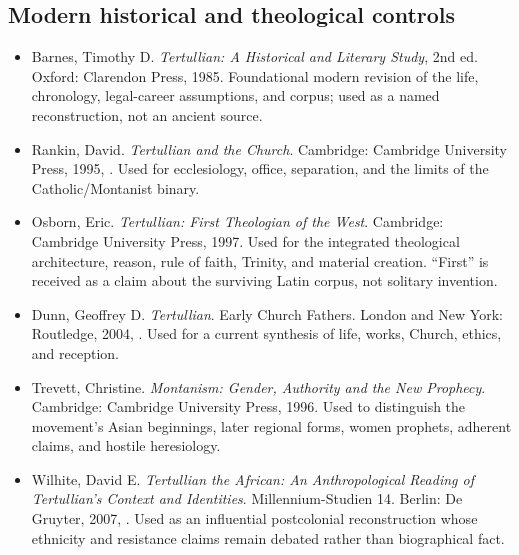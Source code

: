 \subsection{Modern historical and theological controls}

\begin{itemize}
\item Barnes, Timothy D. \emph{Tertullian: A Historical and Literary Study},
2nd ed. Oxford: Clarendon Press, 1985. Foundational modern revision of the life,
chronology, legal-career assumptions, and corpus; used as a named
reconstruction, not an ancient source.

\item Rankin, David. \emph{Tertullian and the Church}. Cambridge: Cambridge
University Press, 1995,
. Used for ecclesiology,
office, separation, and the limits of the Catholic/Montanist binary.

\item Osborn, Eric. \emph{Tertullian: First Theologian of the West}. Cambridge:
Cambridge University Press, 1997. Used for the integrated theological
architecture, reason, rule of faith, Trinity, and material creation. ``First''
is received as a claim about the surviving Latin corpus, not solitary invention.

\item Dunn, Geoffrey D. \emph{Tertullian}. Early Church Fathers. London and New
York: Routledge, 2004,
. Used for a current synthesis of life, works, Church, ethics,
and reception.

\item Trevett, Christine. \emph{Montanism: Gender, Authority and the New
Prophecy}. Cambridge: Cambridge University Press, 1996. Used to distinguish the
movement's Asian beginnings, later regional forms, women prophets, adherent
claims, and hostile heresiology.

\item Wilhite, David E. \emph{Tertullian the African: An Anthropological Reading
of Tertullian's Context and Identities}. Millennium-Studien 14. Berlin: De
Gruyter, 2007,
. Used as an influential postcolonial reconstruction whose ethnicity and
resistance claims remain debated rather than biographical fact.


\end{itemize}
